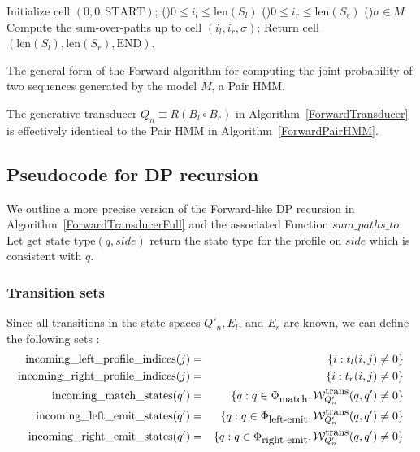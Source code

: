 \documentclass{article}
\newcommand\compose{}
\newcommand\fork{\circ}
\newcommand\States{\Phi}
\newcommand\statesof[1]{\States_{#1}}
\newcommand\weight{{\cal W}}
\newcommand\weightfunof[1]{\weight_{#1}}
\newcommand\transweightfun[1]{\weightfunof{#1}^{\mbox{\small trans}}}
\newcommand\seqlen[1]{\mbox{len}(#1)}
\newcommand\stateset[1]{\statesof{\mbox{\small #1}}}
\newcommand\matchsuffix{match}
\newcommand\leftemitsuffix{left-emit}
\newcommand\rightemitsuffix{right-emit}
\newcommand\matchstates{\stateset{\matchsuffix}}
\newcommand\leftemitstates{\stateset{\leftemitsuffix}}
\newcommand\rightemitstates{\stateset{\rightemitsuffix}}
\newcommand\newTransName[1]{t_{#1}}
\newcommand\getprofiletype{\mbox{get\_state\_type}}
\newcommand\incomingLeftProfile[1]{\mbox{incoming\_left\_profile\_indices}(#1)}
\newcommand\incomingRightProfile[1]{\mbox{incoming\_right\_profile\_indices}(#1)}
\newcommand\incomingM[1]{\mbox{incoming\_match\_states}(#1)}
\newcommand\incomingL[1]{\mbox{incoming\_left\_emit\_states}(#1)}
\newcommand\incomingR[1]{\mbox{incoming\_right\_emit\_states}(#1)}
\newcommand\addToDPFunction{sum\_paths\_to}
\begin{document}
\begin{algorithm}
  Initialize cell $(0,0,\mbox{START})$;
  \BlankLine
  \ForEach(){$0 \leq i_l \leq \seqlen{S_l}$} {
    \ForEach(){$0 \leq i_r \leq \seqlen{S_r}$} {
      \ForEach(){$\sigma \in M$} {
        Compute the sum-over-paths up to cell $(i_l,i_r,\sigma)$;
      }
    }
  }
  Return cell $(\seqlen{S_l},\seqlen{S_r},\mbox{END})$.
\caption{\label{ForwardPairHMM}
The general form of the Forward algorithm for computing the joint probability of two sequences generated by the model $M$, a  Pair HMM.  
}
\end{algorithm}

The generative transducer $Q_n \equiv R \compose (B_l \fork B_r)$
in Algorithm~\ref{ForwardTransducer} is effectively identical to the Pair HMM in Algorithm~\ref{ForwardPairHMM}.






\subsection{Pseudocode for DP recursion}

We outline a more precise version of the Forward-like DP recursion in Algorithm~\ref{ForwardTransducerFull} and the associated Function $\addToDPFunction$. 
Let $\getprofiletype(q,side)$ return the state type for the profile on $side$ which is consistent with $q$.  

\subsubsection{Transition sets}

Since  all transitions in the state spaces $Q'_n, E_l$, and $E_r$ are known, we can define the following sets :
\begin{eqnarray*}
\incomingLeftProfile{j} &=& \{i: \newTransName{l}(i,j) \neq 0 \} \\
\incomingRightProfile{j} &=& \{i: \newTransName{r}(i,j) \neq 0 \} \\
\incomingM{q'} &=& \{ q:q \in \matchstates, \transweightfun{Q'_n}(q,q') \neq 0 \}\\
\incomingL{q'} &=& \{ q:q \in \leftemitstates, \transweightfun{Q'_n}(q,q') \neq 0 \}\\
\incomingR{q'} &=& \{ q:q \in \rightemitstates, \transweightfun{Q'_n}(q,q') \neq 0 \}
\end{eqnarray*}
\end{document}
